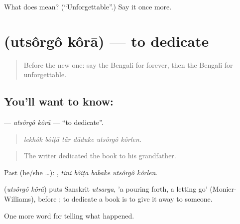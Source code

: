 \begin{tcolorbox}[breakable,colback=teal!4,colframe=teal!35!black,title={Before you move on}]
What does  mean? (\textquotedblleft{}Unforgettable\textquotedblright{}.) Say it once more.
\end{tcolorbox}
\section[\texorpdfstring{\bn{উৎসর্গ} \bn{করা} (utsôrgô kôrā)}{উৎসর্গ করা (utsôrgô kôrā)}]{  (utsôrgô kôrā) — to dedicate}

\label{lesson:BN-C329-utsorgo-kora}



\begin{quote}
Before the new one: say the Bengali for forever, then the Bengali for unforgettable.
\end{quote}

\subsection*{You'll want to know:  }
\textbf{ } — \emph{utsôrgô kôrā} — \textquotedblleft{}to dedicate\textquotedblright{}.

\begin{quote}
     
\end{quote}

\begin{quote}
\emph{lekhôk bôiṭā tā̃r dāduke utsôrgô kôrlen.}
\end{quote}

\begin{quote}
The writer dedicated the book to his grandfather.
\end{quote}

Past (he/she …):     , \emph{tini bôiṭā bābāke utsôrgô kôrlen}.

\begin{cousinweb}
\textbf{ } (\emph{utsôrgô kôrā}) puts Sanskrit \emph{utsarga}, 'a pouring forth, a letting go' (Monier-Williams), before ; to dedicate a book is to give it away to someone.
\end{cousinweb}

\begin{grammarlens}[title={What you've built}]
One more word for telling what happened.
\end{grammarlens}

